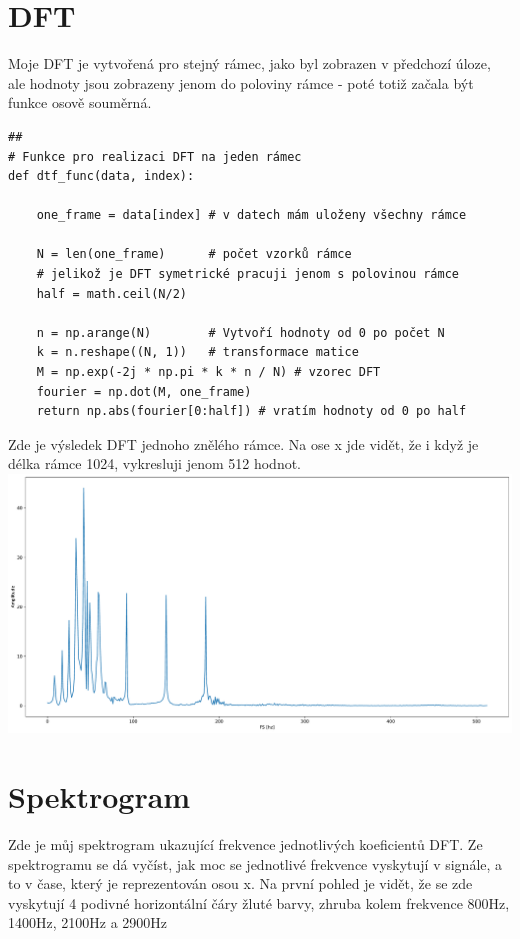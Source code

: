 \documentclass[a4paper, 11pt]{article}
\begin{document}
\newpage
\section{DFT}
Moje DFT je vytvořená pro stejný rámec, jako byl zobrazen v předchozí úloze, ale hodnoty jsou zobrazeny jenom do poloviny rámce - poté totiž začala být funkce osově souměrná.\\

\begin{verbatim}
##
# Funkce pro realizaci DFT na jeden rámec
def dtf_func(data, index):
    
    one_frame = data[index] # v datech mám uloženy všechny rámce 
    
    N = len(one_frame)      # počet vzorků rámce
    # jelikož je DFT symetrické pracuji jenom s polovinou rámce
    half = math.ceil(N/2)  

    n = np.arange(N)        # Vytvoří hodnoty od 0 po počet N
    k = n.reshape((N, 1))   # transformace matice 
    M = np.exp(-2j * np.pi * k * n / N) # vzorec DFT
    fourier = np.dot(M, one_frame) 
    return np.abs(fourier[0:half]) # vratím hodnoty od 0 po half
\end{verbatim}

Zde je výsledek DFT jednoho znělého rámce. Na ose x jde vidět, že i když je délka rámce 1024, vykresluji jenom 512 hodnot. \\

\includegraphics[scale=0.38]{img/2_dft.pdf} \\


\newpage 
\section{Spektrogram}
Zde je můj spektrogram ukazující frekvence jednotlivých koeficientů DFT. Ze spektrogramu se dá vyčíst, jak moc se jednotlivé frekvence vyskytují v signále, a to v čase, který je reprezentován osou x. Na první pohled je vidět, že se zde vyskytují 4 podivné horizontální čáry žluté barvy, zhruba kolem frekvence 800Hz, 1400Hz, 2100Hz a 2900Hz \\ 
\end{document}

